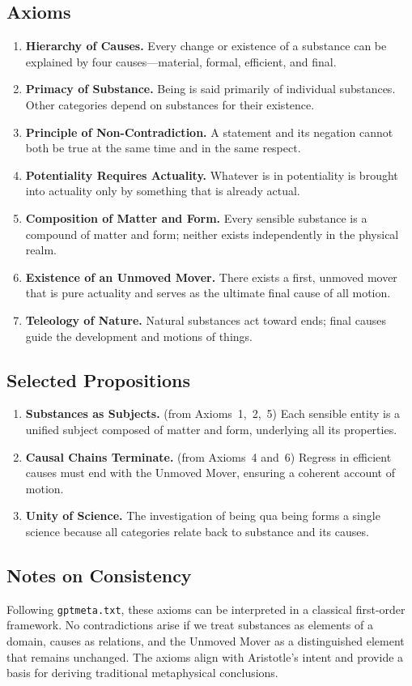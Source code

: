 \documentclass[11pt]{article}
\begin{document}
\subsection*{Axioms}
\begin{enumerate}
  \item \textbf{Hierarchy of Causes.} Every change or existence of a substance can be explained by four causes---material, formal, efficient, and final.
  \item \textbf{Primacy of Substance.} Being is said primarily of individual substances. Other categories depend on substances for their existence.
  \item \textbf{Principle of Non-Contradiction.} A statement and its negation cannot both be true at the same time and in the same respect.
  \item \textbf{Potentiality Requires Actuality.} Whatever is in potentiality is brought into actuality only by something that is already actual.
  \item \textbf{Composition of Matter and Form.} Every sensible substance is a compound of matter and form; neither exists independently in the physical realm.
  \item \textbf{Existence of an Unmoved Mover.} There exists a first, unmoved mover that is pure actuality and serves as the ultimate final cause of all motion.
  \item \textbf{Teleology of Nature.} Natural substances act toward ends; final causes guide the development and motions of things.
\end{enumerate}

\subsection*{Selected Propositions}
\begin{enumerate}
  \item \textbf{Substances as Subjects.} (from Axioms~1,~2,~5) Each sensible entity is a unified subject composed of matter and form, underlying all its properties.
  \item \textbf{Causal Chains Terminate.} (from Axioms~4 and~6) Regress in efficient causes must end with the Unmoved Mover, ensuring a coherent account of motion.
  \item \textbf{Unity of Science.} The investigation of being qua being forms a single science because all categories relate back to substance and its causes.
\end{enumerate}

\subsection*{Notes on Consistency}
Following \texttt{gptmeta.txt}, these axioms can be interpreted in a classical first-order framework. No contradictions arise if we treat substances as elements of a domain, causes as relations, and the Unmoved Mover as a distinguished element that remains unchanged. The axioms align with Aristotle's intent and provide a basis for deriving traditional metaphysical conclusions.
\end{document}
